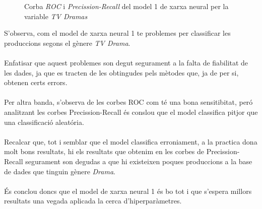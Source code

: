 \documentclass[a4paper, 11pt]{article}
\begin{document}
\begin{figure}[h]
\centering
    \caption{Corba \textit{ROC} i \textit{Precission-Recall} del model 1 de xarxa neural per la variable \textit{TV Dramas}}
    \label{fig:my_label}
\end{figure}
\hspace{-1.5em}S'observa, com el model de xarxa neural 1 te problemes per classificar les produccions segons el gènere \textit{TV Drama}.\\\\
Enfatisar que aquest problemes son degut segurament a la falta de fiabilitat de les dades, ja que es tracten de les obtingudes pels mètodes que, ja de per si, obtenen certs errors.\\\\
Per altra banda, s'observa de les corbes ROC com té una bona sensitibitat, peró analitzant les corbes Precission-Recall és conslou que el model classifica pitjor que una classificació aleatória.\\\\
Recalcar que, tot i semblar que el model classifica erroniament, a la practica dona molt bons resultats, hi els resultats que obtenim en les corbes de Precission-Recall segurament son degudas a que hi existeixen poques produccions a la base de dades que tinguin gènere \textit{Drama}.\\\\
És conclou doncs que el model de xarxa neural 1 és bo tot i que s'espera millors resultats una vegada aplicada la cerca d'hiperparàmetres.
\newpage 
\end{document}
